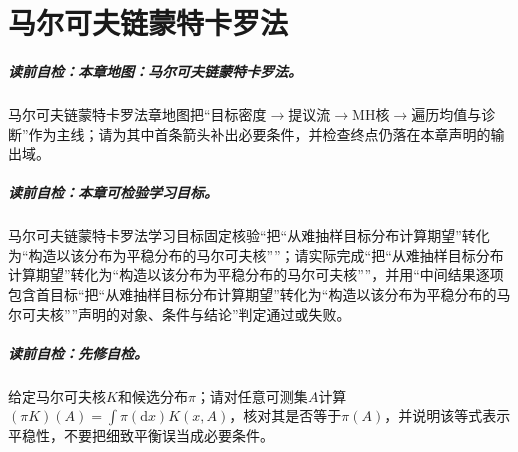 
\chapter{马尔可夫链蒙特卡罗法}\label{chap:V5-C03}

\paragraph{读前自检：本章地图：马尔可夫链蒙特卡罗法。}马尔可夫链蒙特卡罗法章地图把“目标密度$\to$提议流$\to$MH核$\to$遍历均值与诊断”作为主线；请为其中首条箭头补出必要条件，并检查终点仍落在本章声明的输出域。\par
\paragraph{读前自检：本章可检验学习目标。}马尔可夫链蒙特卡罗法学习目标固定核验“把“从难抽样目标分布计算期望”转化为“构造以该分布为平稳分布的马尔可夫核””；请实际完成“把“从难抽样目标分布计算期望”转化为“构造以该分布为平稳分布的马尔可夫核””，并用“中间结果逐项包含首目标“把“从难抽样目标分布计算期望”转化为“构造以该分布为平稳分布的马尔可夫核””声明的对象、条件与结论”判定通过或失败。\par
\paragraph{读前自检：先修自检。}给定马尔可夫核$K$和候选分布$\pi$；请对任意可测集$A$计算$(\pi K)(A)=\int \pi(\mathrm dx)K(x,A)$，核对其是否等于$\pi(A)$，并说明该等式表示平稳性，不要把细致平衡误当成必要条件。\par
